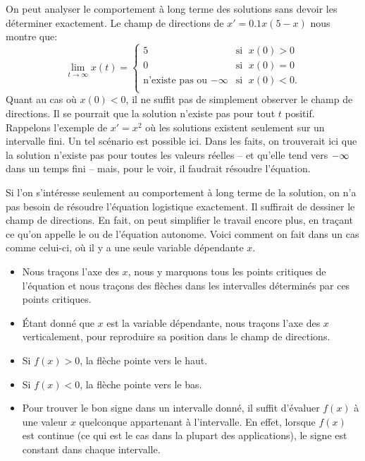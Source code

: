 On peut analyser le comportement à long terme des solutions sans devoir les déterminer exactement.
Le champ de directions de $x' = 0.1 x(5-x)$ nous montre que:
\begin{equation*}
	\lim_{t\to \infty} x(t) = 	\begin{cases}
								5 & \text{si } \; x(0) > 0  \\
								0 & \text{si } \; x(0) = 0  \\
								\text{n'existe pas ou } {-\infty} & \text{si } \; x(0) < 0 . \\
								\end{cases}
\end{equation*}
Quant au cas où $x(0) < 0$, il ne suffit pas de simplement observer le champ de directions.
Il se pourrait que la solution n'existe pas pour tout $t$ positif.
Rappelons l'exemple de $x' = x^2$ où les solutions existent seulement sur un intervalle fini.
Un tel scénario est possible ici.  Dans les faits, on trouverait ici que la solution n'existe
pas pour toutes les valeurs réelles -- et qu'elle tend vers $-\infty$ dans un temps fini --  mais, pour le voir, il faudrait résoudre l'équation.

Si l'on s'intéresse seulement au comportement à long terme de la solution, on n'a pas besoin de résoudre l'équation logistique exactement.
Il suffirait de dessiner le champ de directions.
En fait, on peut simplifier le travail encore plus,
en traçant ce qu'on appelle le \emph{} ou
\emph{} de l'équation autonome.
Voici comment on fait dans un cas comme celui-ci, où il y a une seule variable dépendante $x$.
\begin{itemize}
	\item Nous traçons l'axe des $x$, nous y marquons tous les points critiques de l'équation et nous traçons des flèches dans les intervalles déterminés par ces points critiques.
	\item Étant donné que $x$ est la variable dépendante, nous traçons l'axe des $x$ verticalement,
		pour reproduire sa position dans le champ de directions.
	\item Si $f(x) > 0$, la flèche pointe vers le haut.
	\item Si $f(x) < 0$, la flèche pointe vers le bas.
	\item Pour trouver le bon signe dans un intervalle donné, il suffit d'évaluer $f(x)$ à une valeur $x$ quelconque appartenant à l'intervalle.
	En effet, lorsque $f(x)$ est continue (ce qui est le cas dans la plupart des applications), le signe est constant dans chaque intervalle.
\end{itemize}

